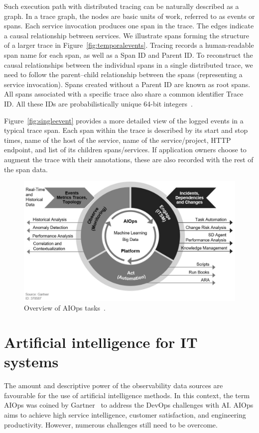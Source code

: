 Such execution path with distributed tracing can be naturally described as a graph. In a trace graph, the nodes are basic units of work, referred to as events or spans. Each service invocation produces one span in the trace. The edges indicate a causal relationship between services. We illustrate spans forming the structure of a larger trace in Figure~\ref{fig:temporalevents}. Tracing records a human-readable span name for each span, as well as a Span ID and Parent ID. To reconstruct the causal relationships between the individual spans in a single distributed trace, we need to follow the parent--child relationship between the spans (representing a service invocation). Spans created without a Parent ID are known as root spans. All spans associated with a specific trace also share a common identifier Trace ID. All these IDs are probabilistically unique 64-bit integers~\cite{sigelman2010dapper}.

Figure~\ref{fig:singleevent} provides a more detailed view of the logged events in a typical trace span. Each span within the trace is described by its start and stop times, name of the host of the service, name of the service/project, HTTP endpoint, and list of its children spans/services. If application owners choose to augment the trace with their annotations, these are also recorded with the rest of the span data. 

\begin{figure}[!htbp]
\centerline{\includegraphics[width=1.0\textwidth]{gfx/chap2/aiopsgartner.jpg}}
\caption{Overview of AIOps tasks~\cite{gartnerinc,gartnermarketguide}.}
\label{fig:overviewaiops}
\end{figure}

\section{Artificial intelligence for IT systems}\label{ch:background:sec:aiops}
The amount and descriptive power of the observability data sources are favourable for the use of artificial intelligence methods. In this context, the term AIOps was coined by Gartner~\cite{gartnermarketguide} to address the DevOps challenges with AI. AIOps aims to achieve high service intelligence, customer satisfaction, and engineering productivity. However, numerous challenges still need to be overcome.





